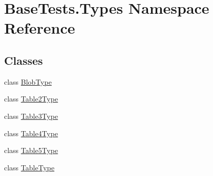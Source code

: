 \hypertarget{namespace_base_tests_1_1_types}{}\section{Base\+Tests.\+Types Namespace Reference}
\label{namespace_base_tests_1_1_types}
\subsection*{Classes}
\begin{DoxyCompactItemize}
\item 
class \mbox{\hyperlink{class_base_tests_1_1_types_1_1_blob_type}{Blob\+Type}}
\item 
class \mbox{\hyperlink{class_base_tests_1_1_types_1_1_table2_type}{Table2\+Type}}
\item 
class \mbox{\hyperlink{class_base_tests_1_1_types_1_1_table3_type}{Table3\+Type}}
\item 
class \mbox{\hyperlink{class_base_tests_1_1_types_1_1_table4_type}{Table4\+Type}}
\item 
class \mbox{\hyperlink{class_base_tests_1_1_types_1_1_table5_type}{Table5\+Type}}
\item 
class \mbox{\hyperlink{class_base_tests_1_1_types_1_1_table_type}{Table\+Type}}
\end{DoxyCompactItemize}
